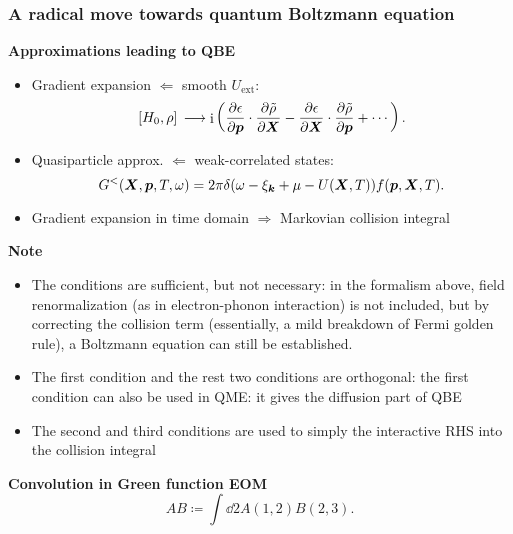\documentclass[t]{beamer}
\DeclareMathOperator{\ii}{i}
\begin{document}
\begin{frame}[allowframebreaks]
\frametitle{A radical move towards quantum Boltzmann equation}

\textbf{Approximations leading to QBE} \begin{itemize}
    \item Gradient expansion $\Leftarrow$ smooth $U_{\text{ext}}$:
    \begin{equation}
        \comm*{H_0}{\rho} \longrightarrow \ii \left(
            \pdv{\epsilon}{\vb*{p}} \cdot \pdv{\tilde{\rho}}{\vb*{X}}
            - \pdv{\epsilon}{\vb*{X}} \cdot \pdv{\tilde{\rho}}{\vb*{p}} + \cdots
        \right).
    \end{equation}
    \item Quasiparticle approx. $\Leftarrow$ weak-correlated states:
    \begin{equation}
       G^<(\vb*{X}, \vb*{p}, T, \omega) = 2 \pi \delta(\omega - \xi_{\vb*{k}} + \mu - U(\vb*{X}, T)) f(\vb*{p}, \vb*{X}, T).
    \end{equation}
    \item Gradient expansion in time domain $\Rightarrow$ Markovian collision integral
\end{itemize}    

\framebreak

\textbf{Note} \begin{itemize}
    \item The conditions are sufficient, but not necessary: 
        in the formalism above, field renormalization
        (as in electron-phonon interaction) is not included, 
        but by correcting the collision term 
        (essentially, a mild breakdown of Fermi golden rule),
        a Boltzmann equation can still be established.
    \item The first condition and the rest two conditions are orthogonal:
        the first condition can also be used in QME: 
        it gives the diffusion part of QBE
    \item The second and third conditions are used to 
        simply the interactive RHS into 
        the collision integral
\end{itemize} 

\framebreak

\textbf{Convolution in Green function EOM} 
\begin{equation}
    AB \coloneqq \int \dd{2} A(1, 2) B(2, 3).
\end{equation}


\end{frame}
\end{document}
